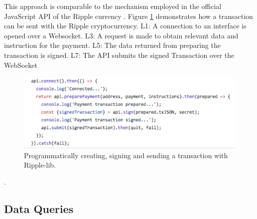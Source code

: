 This approach is comparable to the mechanism employed in the official JavaScript API of the Ripple currency \cite{ripplelib}.
Figure \ref{ripplesendTx} demonstrates how a transaction can be sent with the Ripple cryptocurrency.
L1: A connection to an interface is opened over a Websocket. 
L3: A request is made to obtain relevant data and instruction for the payment.
L5: The data returned from preparing the transaction is signed.
L7: The API submits the signed Transaction over the WebSocket


\begin{figure}
\centering
\includegraphics[width=1\textwidth]{diagrams/ripplelibSendTX.png}
\caption{\label{ripplesendTx}Programmatically creating, signing and sending a transaction with Ripple-lib\cite{ripplelib}.}
\end{figure}.


\subsection{Data Queries}
